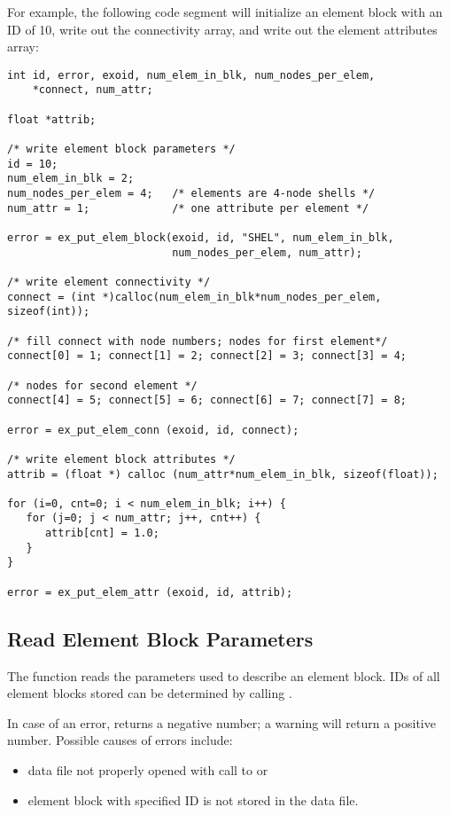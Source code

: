 For example, the following code segment will initialize an
element block with an ID of 10, write out the connectivity array,
and write out the element attributes array:
\begin{lstlisting}
int id, error, exoid, num_elem_in_blk, num_nodes_per_elem,
    *connect, num_attr;

float *attrib;

/* write element block parameters */
id = 10;
num_elem_in_blk = 2;
num_nodes_per_elem = 4;   /* elements are 4-node shells */
num_attr = 1;             /* one attribute per element */

error = ex_put_elem_block(exoid, id, "SHEL", num_elem_in_blk,
                          num_nodes_per_elem, num_attr);

/* write element connectivity */
connect = (int *)calloc(num_elem_in_blk*num_nodes_per_elem, sizeof(int));

/* fill connect with node numbers; nodes for first element*/
connect[0] = 1; connect[1] = 2; connect[2] = 3; connect[3] = 4;

/* nodes for second element */
connect[4] = 5; connect[5] = 6; connect[6] = 7; connect[7] = 8;

error = ex_put_elem_conn (exoid, id, connect);

/* write element block attributes */
attrib = (float *) calloc (num_attr*num_elem_in_blk, sizeof(float));

for (i=0, cnt=0; i < num_elem_in_blk; i++) {
   for (j=0; j < num_attr; j++, cnt++) {
      attrib[cnt] = 1.0;
   }
}

error = ex_put_elem_attr (exoid, id, attrib);
\end{lstlisting}

\subsection{Read Element Block Parameters}\label{s:gebparam}

The function  reads the parameters used to
describe an element block. IDs of all element blocks stored can be
determined by calling .

In case of an error,  returns a negative
number; a warning will return a positive number. Possible causes of
errors include:


\begin{itemize}
 \item data file not properly opened with call to 
or 

 \item element block with specified ID is not stored in
the data file.
\end{itemize}


